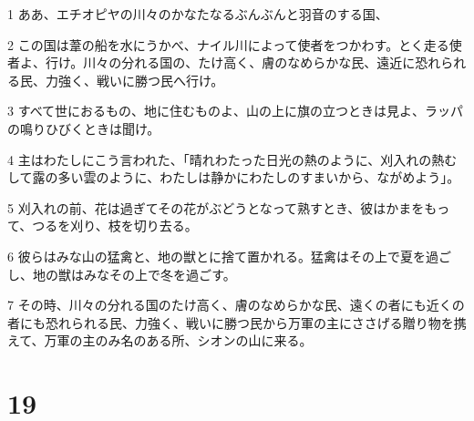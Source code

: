 \par 1 ああ、エチオピヤの川々のかなたなるぶんぶんと羽音のする国、
\par 2 この国は葦の船を水にうかべ、ナイル川によって使者をつかわす。とく走る使者よ、行け。川々の分れる国の、たけ高く、膚のなめらかな民、遠近に恐れられる民、力強く、戦いに勝つ民へ行け。
\par 3 すべて世におるもの、地に住むものよ、山の上に旗の立つときは見よ、ラッパの鳴りひびくときは聞け。
\par 4 主はわたしにこう言われた、「晴れわたった日光の熱のように、刈入れの熱むして露の多い雲のように、わたしは静かにわたしのすまいから、ながめよう」。
\par 5 刈入れの前、花は過ぎてその花がぶどうとなって熟すとき、彼はかまをもって、つるを刈り、枝を切り去る。
\par 6 彼らはみな山の猛禽と、地の獣とに捨て置かれる。猛禽はその上で夏を過ごし、地の獣はみなその上で冬を過ごす。
\par 7 その時、川々の分れる国のたけ高く、膚のなめらかな民、遠くの者にも近くの者にも恐れられる民、力強く、戦いに勝つ民から万軍の主にささげる贈り物を携えて、万軍の主のみ名のある所、シオンの山に来る。

\chapter{19}

